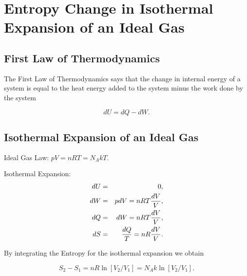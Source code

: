 

\section{Entropy Change in Isothermal Expansion of an Ideal Gas}

\subsection{First Law of Thermodynamics}

The First Law of Thermodynamics says that the change in internal energy
of a system is equal to the heat energy added to the system  minus the 
work done by the system

$$ dU = dQ - dW.$$

\subsection{Isothermal Expansion of an Ideal Gas}

Ideal Gas Law: $pV = nRT = N_AkT$.

Isothermal Expansion: 
  \begin{eqnarray*}
   dU & = & 0, \\
   dW & = & pdV = nRT {dV\over V}, \\
   dQ & = & dW  = nRT {dV\over V}, \\
   dS & = & {dQ\over T} = nR {dV\over V}. 
  \end{eqnarray*}

By integrating the Entropy for the isothermal expansion we obtain

  $$S_2 - S_1 = n R \ln[V_2/V_1] = N_A k \ln[V_2/V_1].$$
